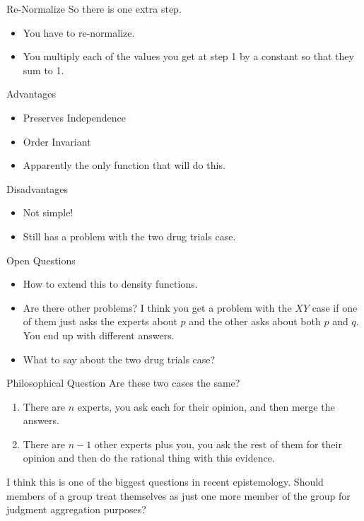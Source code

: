 \documentclass[
  ignorenonframetext,
]{beamer}
\providecommand{\tightlist}{%
  \setlength{\itemsep}{0pt}\setlength{\parskip}{0pt}}
\begin{document}
\begin{frame}{Re-Normalize}
\protect\hypertarget{re-normalize}{}
So there is one extra step.

\begin{itemize}
\tightlist
\item
  You have to re-normalize.
\item
  You multiply each of the values you get at step 1 by a constant so
  that they sum to 1.
\end{itemize}
\end{frame}

\begin{frame}{Advantages}
\protect\hypertarget{advantages}{}
\begin{itemize}[<+->]
\tightlist
\item
  Preserves Independence
\item
  Order Invariant
\item
  Apparently the only function that will do this.
\end{itemize}
\end{frame}

\begin{frame}{Disadvantages}
\protect\hypertarget{disadvantages}{}
\begin{itemize}[<+->]
\tightlist
\item
  Not simple!
\item
  Still has a problem with the two drug trials case.
\end{itemize}
\end{frame}

\begin{frame}{Open Questions}
\protect\hypertarget{open-questions}{}
\begin{itemize}[<+->]
\tightlist
\item
  How to extend this to density functions.
\item
  Are there other problems? I think you get a problem with the \(XY\)
  case if one of them just asks the experts about \(p\) and the other
  asks about both \(p\) and \(q\). You end up with different answers.
\item
  What to say about the two drug trials case?
\end{itemize}
\end{frame}

\begin{frame}{Philosophical Question}
\protect\hypertarget{philosophical-question}{}
Are these two cases the same?

\begin{enumerate}
\tightlist
\item
  There are \(n\) experts, you ask each for their opinion, and then
  merge the answers.
\item
  There are \(n-1\) other experts plus you, you ask the rest of them for
  their opinion and then do the rational thing with this evidence.
\end{enumerate}

I think this is one of the biggest questions in recent epistemology.
Should members of a group treat themselves as just one more member of
the group for judgment aggregation purposes?
\end{frame}
\end{document}
